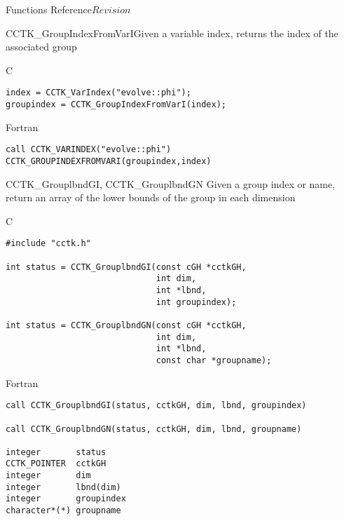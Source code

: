 \begin{cactuspart}{ Functions Reference}{}{$Revision$}
\begin{FunctionDescription}{CCTK\_GroupIndexFromVarI}{Given a variable index, returns the index of the associated group}
\begin{ExampleSection}
\begin{Example}{C}
\begin{verbatim}
index = CCTK_VarIndex("evolve::phi");
groupindex = CCTK_GroupIndexFromVarI(index);
\end{verbatim}
\end{Example}
\begin{Example}{Fortran}
\begin{verbatim}
call CCTK_VARINDEX("evolve::phi")
CCTK_GROUPINDEXFROMVARI(groupindex,index)
\end{verbatim}
\end{Example}
\end{ExampleSection}
\end{FunctionDescription}


\begin{FunctionDescription}{CCTK\_GrouplbndGI, CCTK\_GrouplbndGN}
\label{CCTK-GrouplbndGI}
\label{CCTK-GrouplbndGN}
Given a group index or name, return an array of the lower bounds of the group in each dimension

\begin{SynopsisSection}
\begin{Synopsis}{C}
\begin{verbatim}
#include "cctk.h"

int status = CCTK_GrouplbndGI(const cGH *cctkGH,
                              int dim,
                              int *lbnd,
                              int groupindex);

int status = CCTK_GrouplbndGN(const cGH *cctkGH,
                              int dim,
                              int *lbnd,
                              const char *groupname);
\end{verbatim}
\end{Synopsis}
\begin{Synopsis}{Fortran}
\begin{verbatim}
call CCTK_GrouplbndGI(status, cctkGH, dim, lbnd, groupindex)

call CCTK_GrouplbndGN(status, cctkGH, dim, lbnd, groupname)

integer       status
CCTK_POINTER  cctkGH
integer       dim
integer       lbnd(dim)
integer       groupindex
character*(*) groupname
\end{verbatim}
\end{Synopsis}
\end{SynopsisSection}


\end{FunctionDescription}
\end{cactuspart}
